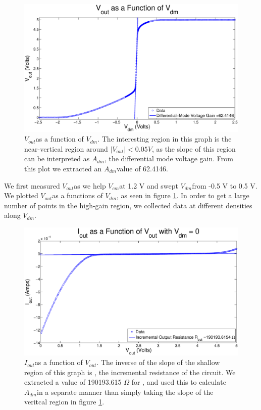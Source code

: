 \documentclass{article}
\newcommand{\Vout}{{$V_{out}$}}
\newcommand{\Vcm}{{$V_{cm}$}}
\newcommand{\Vdm}{{$V_{dm}$}}
\newcommand{\Iout}{{$I_{out}$}}
\newcommand{\Adm}{{$A_{dm}$}}
\begin{document}
\begin{figure}[H]
\centering
\includegraphics[width=\linewidth]{../Figures/Exp2P1.eps}
\caption{\Vout as a function of \Vdm. The interesting region in this graph is the near-vertical region around $|V_{out}| < 0.05 V$, as the slope of this region can be interpreted as \Adm, the differential mode voltage gain. From this plot we extracted an \Adm value of 62.4146.}
\label{fig:exp2p1}
\end{figure}

We first measured \Vout as we help \Vcm at 1.2 V and swept \Vdm from -0.5 V to 0.5 V. We plotted \Vout as a functions of \Vdm, as seen in figure \ref{fig:exp2p1}. In order to get a large number of points in the high-gain region, we collected data at different densities along \Vdm.

\begin{figure}[H]
\centering
\includegraphics[width=\linewidth]{../Figures/Exp2P2.eps}
\caption{\Iout as a function of \Vout. The inverse of the slope of the shallow region of this graph is \Ro, the incremental resistance of the circuit. We extracted a value of 190193.615 $\Omega$ for \Ro, and used this to calculate \Adm in a separate manner than simply taking the slope of the veritcal region in figure \ref{fig:exp2p1}.}
\label{fig:exp2p2}
\end{figure}
\end{document}
